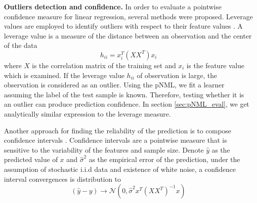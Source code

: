 \documentclass[conference,letterpaper]{IEEEtran}
\begin{document}
\textbf{Outliers detection and confidence.}
In order to evaluate a pointwise confidence measure for linear regression, several methods were proposed. 
Leverage values are employed to identify outliers with respect to their feature values \cite{cardinali2013observation}. 
A leverage value is a measure of the distance between an observation and the center of the data
\begin{equation}
h_{ii}=x_i^T(XX^T)x_i
\end{equation}
where $X$ is the correlation matrix of the training set and $x_i$ is the feature value which is examined.
If the leverage value $h_{ii}$ of observation is large, the observation is considered as an outlier.
Using the pNML, we fit a learner assuming the label of the test sample is known. 
Therefore, testing whether it is an outlier can produce prediction confidence.
In section \ref{sec:pNML_eval}, we get analytically similar expression to the leverage measure.

Another approach for finding the reliability of the prediction is to compose confidence intervals \cite{trevor2009elements}.
Confidence intervals are a pointwise measure that is sensitive to the variability of the features and sample size.
Denote $\hat{y}$ as the predicted value of $x$ and  $\hat{\sigma}^2$ as the empirical error of the prediction, under the assumption of stochastic i.i.d data and existence of white noise, a confidence interval convergences is distribution to
\begin{equation}
(\hat{y} - y) \xrightarrow{} \mathcal{N}(0, \hat{\sigma}^2 x^T(XX^T)^{-1}x)
\end{equation}


\end{document}
